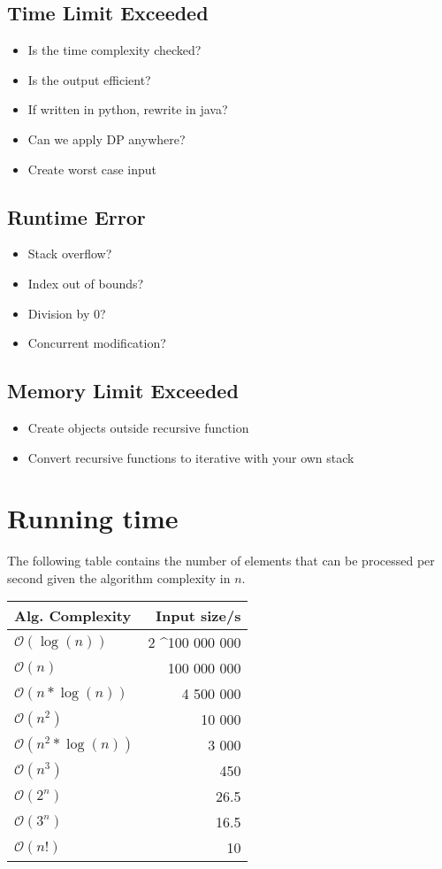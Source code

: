 \documentclass[8pt,a4paper,landscape,oneside]{amsart}
\newcommand{\bigO}{\mathcal{O}}
\begin{document}
\begin{multicols*}{3}
  \subsection{Time Limit Exceeded}
    \begin{itemize}
    \item Is the time complexity checked?
    \item Is the output efficient?
    \item If written in python, rewrite in java?
    \item Can we apply DP anywhere?
    \item Create worst case input
    \end{itemize}
  \subsection{Runtime Error}
    \begin{itemize}
    \item Stack overflow?
    \item Index out of bounds?
    \item Division by $0$?
    \item Concurrent modification?
    \end{itemize}
  \subsection{Memory Limit Exceeded}
    \begin{itemize}
    \item Create objects outside recursive function
    \item Convert recursive functions to iterative with your own stack
    \end{itemize}
        
        
\section{Running time}
The following table contains the number of elements that can be processed per second given the algorithm complexity in $n$.
\begin{center}
\begin{tabular}{lr}
Alg. Complexity & Input size/s \\ \hline
$\bigO(\log(n))$     & 2 \textasciicircum 100 000 000 \\
$\bigO(n)$           & 100 000 000 \\
$\bigO(n*\log(n))$   & 4 500 000 \\
$\bigO(n^2)$         & 10 000 \\
$\bigO(n^2*\log(n))$ & 3 000 \\
$\bigO(n^3)$         & 450 \\
$\bigO(2^n)$         & 26.5 \\
$\bigO(3^n)$         & 16.5 \\
$\bigO(n!)$          & 10
\end{tabular}
\end{center}



\end{multicols*}
\end{document}
